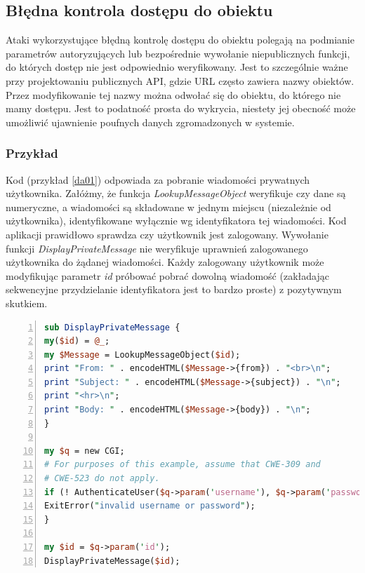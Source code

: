 \documentclass[11pt,a4paper,polish,thesis,oneside]{dcsbook}
\begin{document}
\subsection{Błędna kontrola dostępu do obiektu}
Ataki wykorzystujące błędną kontrolę dostępu do obiektu polegają na podmianie parametrów autoryzujących lub bezpośrednie wywołanie niepublicznych funkcji, do których dostęp nie jest odpowiednio weryfikowany. Jest to szczególnie ważne przy projektowaniu publicznych API, gdzie URL często zawiera nazwy obiektów. Przez modyfikowanie tej nazwy można odwołać się do obiektu, do którego nie mamy dostępu. Jest to podatność prosta do wykrycia, niestety jej obecność może umożliwić ujawnienie poufnych danych zgromadzonych w systemie.

\subsubsection*{Przykład}
Kod (przykład \ref{da01}) odpowiada za pobranie wiadomości prywatnych użytkownika. Załóżmy, że funkcja \textit{LookupMessageObject} weryfikuje czy dane są numeryczne, a wiadomości są składowane w jednym miejscu (niezależnie od użytkownika), identyfikowane wyłącznie wg identyfikatora tej wiadomości. Kod aplikacji prawidłowo sprawdza czy użytkownik jest zalogowany. Wywołanie funkcji \textit{DisplayPrivateMessage} nie weryfikuje uprawnień zalogowanego użytkownika do żądanej wiadomości. Każdy zalogowany użytkownik może modyfikując parametr \textit{id} próbować pobrać dowolną wiadomość (zakładając sekwencyjne przydzielanie identyfikatora jest to bardzo proste) z pozytywnym skutkiem.

\begin{lstlisting}[language=perl,frame=single,caption=przykładowy kod podatny na bezpośrednie odwołanie \cite{directaccess},label=da01,numbers=left]
sub DisplayPrivateMessage {
my($id) = @_;
my $Message = LookupMessageObject($id);
print "From: " . encodeHTML($Message->{from}) . "<br>\n";
print "Subject: " . encodeHTML($Message->{subject}) . "\n";
print "<hr>\n";
print "Body: " . encodeHTML($Message->{body}) . "\n";
}

my $q = new CGI;
# For purposes of this example, assume that CWE-309 and
# CWE-523 do not apply.
if (! AuthenticateUser($q->param('username'), $q->param('password'))) {
ExitError("invalid username or password");
}

my $id = $q->param('id');
DisplayPrivateMessage($id);
\end{lstlisting}
\end{document}
